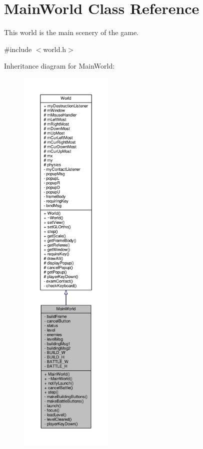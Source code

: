 \hypertarget{classMainWorld}{}\section{Main\+World Class Reference}
\label{classMainWorld}


This world is the main scenery of the game.  




{\ttfamily \#include $<$world.\+h$>$}



Inheritance diagram for Main\+World\+:
\nopagebreak
\begin{figure}[H]
\begin{center}
\leavevmode
\includegraphics[height=550pt]{classMainWorld__inherit__graph}
\end{center}
\end{figure}



